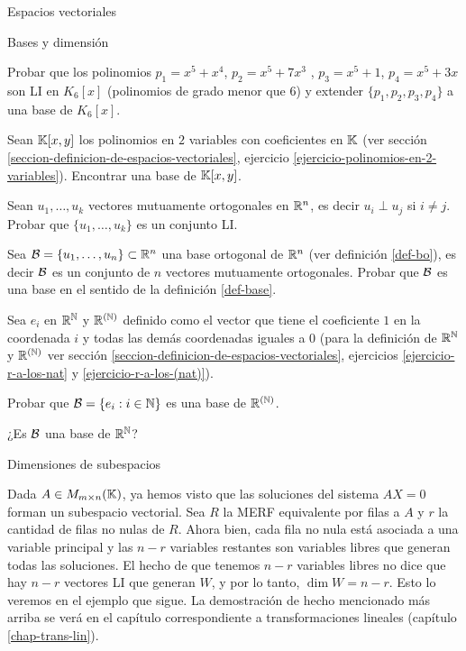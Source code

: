 \begin{chapter}{Espacios vectoriales}
\begin{section}{Bases y dimensi\'on}
\begin{enumex}
        \item Probar  que los polinomios $p_1 = x^5 + x^4$, $p_2 = x^5+7x^3$ , $p_3 = x^5+ 1$, $p_4 = x^5 + 3x$ son LI en $K_6[x]$ (polinomios de grado menor que $6$) y extender $\{ p_1 , p_2 , p_3 , p_4 \}$ a una base de $K_6[x]$.
        \item Sean $\mathbb K[x,y]$ los polinomios en $2$ variables con coeficientes en $\mathbb K$ (ver sección \ref{seccion-definicion-de-espacios-vectoriales},  ejercicio \ref{ejercicio-polinomios-en-2-variables}). Encontrar una base de $\mathbb K[x,y]$. 
        \item Sean $u_1,\ldots,u_k$ vectores mutuamente ortogonales en $\mathbb R^n$,  es decir $u_i \perp u_j$  si $i \ne j$. Probar que  $\{u_1,\ldots,u_k\}$ es un conjunto LI.
        \item 
        Sea $\mathcal{B} =\{u_1,\ldots,u_n\}\subset \mathbb R^n$  una base ortogonal de $\mathbb R^n$ (ver definición \ref{def-bo}),  es decir $\mathcal{B}$  es un conjunto de $n$ vectores mutuamente ortogonales. Probar  que $\mathcal{B}$ es una base en el sentido de la definición \ref{def-base}.   
        \item Sea $e_i$ en $\mathbb R^\mathbb N$ y $\mathbb R^{(\mathbb N)}$ definido como el vector que tiene el coeficiente $1$  en la coordenada $i$  y todas las demás coordenadas iguales a $0$ (para la definición de  $\mathbb R^\mathbb N$ y $\mathbb R^{(\mathbb N)}$ ver sección \ref{seccion-definicion-de-espacios-vectoriales}, ejercicios \ref{ejercicio-r-a-los-nat} y \ref{ejercicio-r-a-los-(nat)}).
        
        Probar que $\mathcal{B} = \{e_i: i \in \mathbb N\}$ es una base de  $\mathbb R^{(\mathbb N)}$.

        ¿Es $\mathcal{B}$ una base de  $\mathbb R^\mathbb N$?
    \end{enumex}


    \end{section}



    
    \begin{section}{Dimensiones de subespacios}\label{seccion-dimensiones-de-subespacios}
        
            
        Dada $A \in M_{m\times n}(\mathbb K)$,  ya hemos visto que  las soluciones del sistema $AX=0$ forman un subespacio vectorial. Sea $R $ la MERF equivalente por filas a $A$ y $r$ la cantidad de filas no nulas de $R$. Ahora bien, cada fila no nula está asociada  a una  variable principal y las  $n-r$ variables restantes son variables libres  que generan  todas las soluciones.
        El  hecho de que tenemos $n-r$ variables libres no dice que hay $n-r$ vectores LI que generan $W$, y por lo tanto,  $\dim W = n-r$. Esto lo veremos en el ejemplo que sigue. La demostración de hecho mencionado más arriba se verá en el capítulo correspondiente  a transformaciones lineales (capítulo \ref{chap-trans-lin}).
        

\end{section}
\end{chapter}

